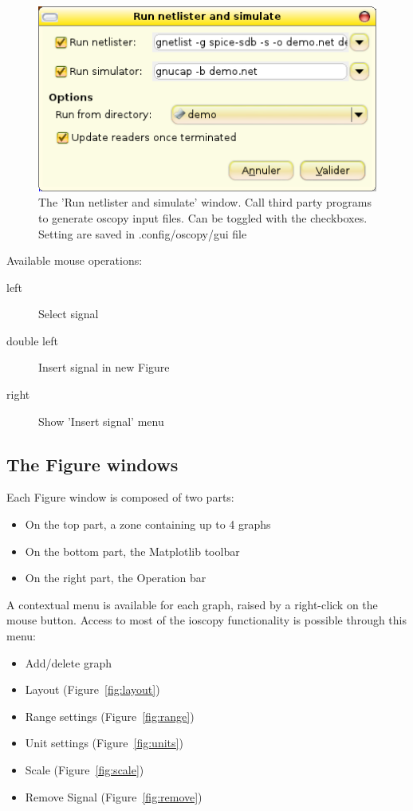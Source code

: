 \documentclass[a4paper,11pt]{article}
\begin{document}
\begin{figure}[htbp]
  \includegraphics[scale=.5]{../png/ioscopy-netnsim.png}
  \caption{The 'Run netlister and simulate' window. Call third party programs to generate oscopy input files. Can be toggled with the checkboxes. Setting are saved in .config/oscopy/gui file}
  \label{fig:netnsim}

\end{figure}

\noindent Available mouse operations:
\begin{description}
\item[left] Select signal
\item[double left] Insert signal in new Figure
\item[right] Show 'Insert signal' menu
\end{description}

\subsection{The Figure windows}

Each Figure window is composed of two parts:
\begin{itemize}
\item On the top part, a zone containing up to 4 graphs
\item On the bottom part, the Matplotlib toolbar
\item On the right part, the Operation bar
\end{itemize}
A contextual menu is available for each graph, raised by a right-click on the mouse button.
Access to most of the ioscopy functionality is possible through this menu:
\begin{itemize}
\item Add/delete graph
\item Layout (Figure~\ref{fig:layout})
\item Range settings (Figure~\ref{fig:range})
\item Unit settings (Figure~\ref{fig:units})
\item Scale (Figure~\ref{fig:scale})
\item Remove Signal (Figure~\ref{fig:remove})
\end{itemize}
\end{document}
